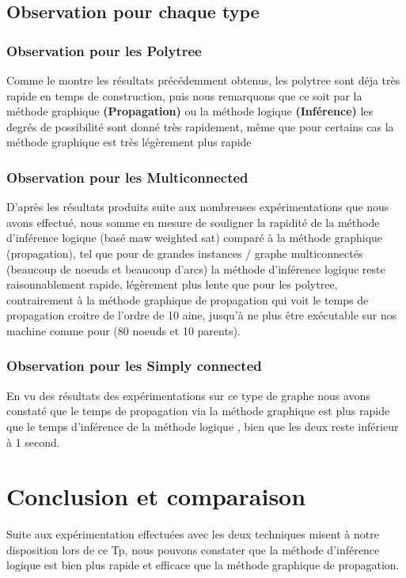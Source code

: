 \documentclass[12pt,a4paper,oneside]{book}
\begin{document}
    \section{Observation pour chaque type }
    \subsection{Observation pour les Polytree}
    Comme le montre les résultats précédemment obtenus, les polytree sont déja très rapide en temps de construction, puis nous remarquons que ce soit par la méthode graphique \textbf{(Propagation)} ou la méthode logique \textbf{(Inférence)} les degrés de possibilité sont donné très rapidement, même que pour certains cas la méthode graphique est très légèrement plus rapide
    
  
    
    
    \subsection{Observation pour les Multiconnected}
    D'après les résultats produits suite aux nombreuses expérimentations que nous avons effectué, nous somme en mesure de souligner la rapidité de la méthode d'inférence logique (basé maw weighted sat) comparé à la méthode graphique (propagation), tel que pour de grandes instances / graphe multiconnectés (beaucoup de noeuds et beaucoup d'arcs) la méthode d'inférence logique reste raisonnablement rapide, légèrement plus lente que pour les polytree, contrairement à la méthode graphique de propagation qui voit le temps de propagation croitre de l'ordre de 10 aine, jusqu'à ne plus être exécutable sur nos machine comme pour (80 noeuds et 10 parents).
    

    
    \subsection{Observation pour les Simply connected}
    En vu des résultats des expérimentations sur ce type de graphe nous avons constaté que le temps de propagation via la méthode graphique est plus rapide que le temps d'inférence de la méthode logique , bien que les deux reste inférieur à 1 second.
    
    \newpage
    \chapter{Conclusion et comparaison}
    Suite aux expérimentation effectuées avec les deux techniques misent à notre disposition lors de ce Tp, nous pouvons constater que la méthode d'inférence logique est bien plus rapide et efficace que la méthode graphique de propagation.\\
    
\end{document}
